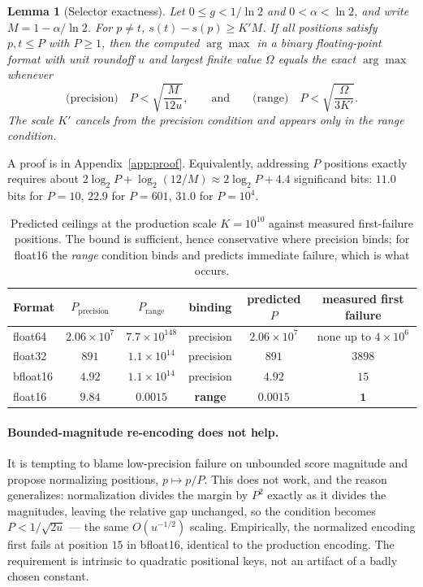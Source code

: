 \documentclass{article}
\newtheorem{lemma}{Lemma}
\theoremstyle{definition}
\begin{document}
\begin{lemma}[Selector exactness]\label{lem:margin}
Let $0\le g<1/\ln2$ and $0<\alpha<\ln 2$, and write $M=1-\alpha/\ln2$. For
$p\neq t$, $s(t)-s(p)\ge K'M$. If all positions satisfy $p,t\le P$ with $P\ge1$,
then the computed $\arg\max$ in a binary floating-point format with unit roundoff
$u$ and largest finite value $\Omega$ equals the exact $\arg\max$ whenever
\[
\text{(precision)}\quad P<\sqrt{\frac{M}{12u}},
\qquad\text{and}\qquad
\text{(range)}\quad P<\sqrt{\frac{\Omega}{3K'}} .
\]
The scale $K'$ cancels from the precision condition and appears only in the range
condition.
\end{lemma}

A proof is in Appendix~\ref{app:proof}. Equivalently, addressing $P$ positions
exactly requires about $2\log_2 P+\log_2(12/M)\approx 2\log_2 P+4.4$ significand
bits: $11.0$ bits for $P=10$, $22.9$ for $P=601$, $31.0$ for $P=10^4$.

\begin{table}[t]
\caption{Predicted ceilings at the production scale $K=10^{10}$ against measured
first-failure positions. The bound is sufficient, hence conservative where
precision binds; for float16 the \emph{range} condition binds and predicts
immediate failure, which is what occurs.}
\label{tab:precision}
\begin{center}
\begin{tabular}{lccccc}
\toprule
Format & $P_{\text{precision}}$ & $P_{\text{range}}$ & binding & predicted $P$ & measured first failure \\
\midrule
float64  & $2.06\times10^{7}$ & $7.7\times10^{148}$ & precision & $2.06\times10^{7}$ & none up to $4\times10^{6}$ \\
float32  & $891$              & $1.1\times10^{14}$  & precision & $891$              & $3898$ \\
bfloat16 & $4.92$             & $1.1\times10^{14}$  & precision & $4.92$             & $15$ \\
float16  & $9.84$             & $\mathbf{0.0015}$   & \textbf{range} & $\mathbf{0.0015}$ & $\mathbf{1}$ \\
\bottomrule
\end{tabular}
\end{center}
\end{table}

\paragraph{Bounded-magnitude re-encoding does not help.} It is tempting to blame
low-precision failure on unbounded score magnitude and propose normalizing
positions, $p\mapsto p/P$. This does not work, and the reason generalizes:
normalization divides the margin by $P^2$ exactly as it divides the magnitudes,
leaving the relative gap unchanged, so the condition becomes $P<1/\sqrt{2u}$ ---
the same $O(u^{-1/2})$ scaling. Empirically, the normalized encoding first fails
at position $15$ in bfloat16, identical to the production encoding. The
requirement is intrinsic to quadratic positional keys, not an artifact of a badly
chosen constant.
\end{document}

